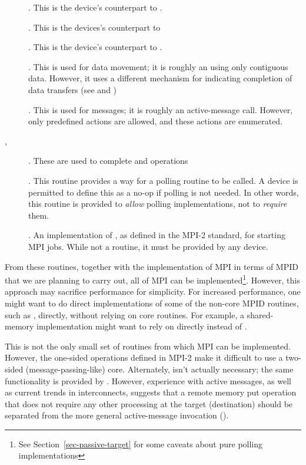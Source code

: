 \documentclass{article}
\begin{document}
\begin{description}
\item[]. This is the device's counterpart to
. 
\item[]. This is the devices's counterpart to
\item[]. This is the device's counterpart to .
\item[]. This is used for data movement; it is roughly an
 using only contiguous data.  However, it uses a
different mechanism for indicating completion of data transfers (see  and )
\item[]. This is used for messages; it is roughly an
active-message call.  However, only predefined actions are allowed,
and these actions are enumerated.
\item[, ]. These
are used to complete  
and  operations
\item[]. This routine provides a way for a polling routine to
be called.  A device is permitted to define this as a no-op if polling
is not needed.  In other words, this routine is provided to
\emph{allow} polling implementations, not to \emph{require} them.
\item[]. An implementation of , as defined in the
  MPI-2 standard, for starting MPI jobs.  While not a routine, it must be 
  provided by any device.  
\end{description}
From these routines, together with the implementation of MPI in terms of MPID
that we are planning to carry out, all of MPI can be implemented\footnote{See
Section~\ref{sec-passive-target} for some caveats about pure polling
implementations}.  However, this approach may sacrifice performance
for simplicity.  For increased performance, one might want to do direct
implementations of some of the non-core MPID routines, such as
, directly, without relying on core routines.  For example, a
shared-memory implementation might want to rely on  directly
instead of .

This is not the only small set of routines from which MPI can be
implemented.  However, the one-sided operations defined in MPI-2 make
it difficult to use a two-sided (message-passing-like) core.
Alternately,  isn't actually necessary; the same
functionality is provided by .  However, experience
with active messages, as well as current trends in interconnects,
suggests that a remote memory put operation that does not require any
other processing at the target (destination) should be separated from
the more general active-message invocation ().
\end{document}
